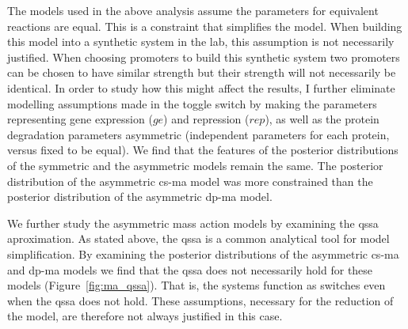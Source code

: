 The models used in the above analysis assume the parameters for equivalent reactions are equal. This is a constraint that simplifies the model. When building this model into a synthetic system in the lab, this assumption is not necessarily justified. When choosing promoters to build this synthetic system two promoters can be chosen to have similar strength but their strength will not necessarily be identical.  In order to study how this might affect the results, I further eliminate modelling assumptions made in the toggle switch by making the parameters representing gene expression ($ge$) and repression ($rep$), as well as the protein degradation parameters asymmetric (independent parameters for each protein, versus fixed to be equal). We find that the features of the posterior distributions of the symmetric and the asymmetric models remain the same. The posterior distribution of the asymmetric \acrshort{cs-ma} model was more constrained than the posterior distribution of the asymmetric \acrshort{dp-ma} model. 

We further study the asymmetric mass action models by examining the \acrshort{qssa} aproximation. As stated above, the \acrshort{qssa} is a common analytical tool for model simplification. By examining the posterior distributions of the asymmetric \acrshort{cs-ma} and \acrshort{dp-ma} models we find that the \acrshort{qssa} does not necessarily hold for these models (Figure~\ref{fig:ma_qssa}). That is, the systems function as switches even when the \acrshort{qssa} does not hold. These assumptions, necessary for the reduction of the model, are therefore not always justified in this case. 

